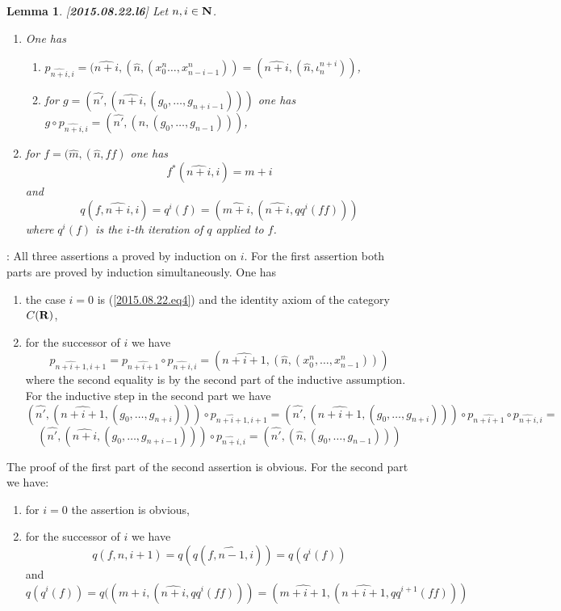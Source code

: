 \documentclass[11pt]{article}
\newenvironment{proof}{{\bf Proof}:}{\vskip 5mm }
\newtheorem{lemma}[proposition]{Lemma}
\newcommand{\llabel}[1]{\label{#1}[{\bf #1}]}
\newcommand{\nn}{{\bf N\rm}}
\newcommand{\nat}{\nn}
\newcommand{\rr}{{\bf R}}
\newcommand{\wh}{\widehat}
\begin{document}
\begin{lemma}
\llabel{2015.08.22.l6}
Let $n,i\in\nat$. 
%
\begin{enumerate}
\item One has
%
\begin{enumerate}
\item $p_{\wh{n+i},i}=(\wh{n+i},(\wh{n},(x_0^n\dots,x_{n-i-1}^n))=(\wh{n+i},(\wh{n},\iota^{n+i}_{n}))$,
\item for $g=(\wh{n'},(\wh{n+i},(g_0,\dots,g_{n+i-1})))$ one has $g\circ p_{\wh{n+i},i}=(\wh{n'},(\wh{n},(g_0,\dots,g_{n-1})))$,
\end{enumerate}
%
\item for $f=(\wh{m},(\wh{n},ff)$ one has
%
$$f^*(\wh{n+i},i)=m+i$$
%
and
%
$$q(f,\wh{n+i},i)=q^i(f)=(\wh{m+i},(\wh{n+i},qq^i(ff)))$$
%
where $q^i(f)$ is the $i$-th iteration of $q$ applied to $f$.  
\end{enumerate}
\end{lemma}
%
\begin{proof}
All three assertions a proved by induction on $i$. For the first assertion both parts are proved by induction simultaneously. One has
%
\begin{enumerate}
\item the case $i=0$ is (\ref{2015.08.22.eq4}) and the identity axiom of the category $C(\rr)$,
\item for the successor of $i$ we have
%
$$p_{\wh{n+i+1},i+1}=p_{\wh{n+i+1}}\circ p_{\wh{n+i},i}=(\wh{n+i+1},(\wh{n},(x_0^n,\dots,x_{n-1}^n)))$$
%
where the second equality is by the second part of the inductive assumption. For the inductive step in the second part we have
%
$$(\wh{n'},(\wh{n+i+1},(g_0,\dots,g_{n+i})))\circ p_{\wh{n+i+1},i+1}=(\wh{n'},(\wh{n+i+1},(g_0,\dots,g_{n+i})))\circ p_{\wh{n+i+1}}\circ p_{\wh{n+i},i}=$$$$
(\wh{n'},(\wh{n+i},(g_0,\dots,g_{n+i-1})))\circ p_{\wh{n+i},i}=(\wh{n'},(\wh{n},(g_0,\dots,g_{n-1})))$$
%
\end{enumerate}
%
The proof of the first part of the second assertion is obvious. For the second part we have:
%
\begin{enumerate}
\item for $i=0$ the assertion is obvious,
\item for the successor of $i$ we have 
%
$$q(f,\wh{n},i+1)=q(q(f,\wh{n-1},i))=q(q^i(f))$$
%
and 
$$q(q^i(f))=q((\wh{m+i},(\wh{n+i},qq^i(ff)))=(\wh{m+i+1},(\wh{n+i+1},qq^{i+1}(ff)))$$
%
\end{enumerate}
%
\end{proof}
%
\end{document}
